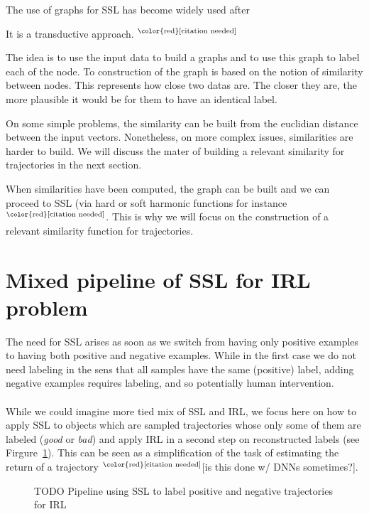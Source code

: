 \documentclass{article}
\newcommand{\needcite}{${}^{\text{\color{red}[citation needed]}}$}
\begin{document}
The use of graphs for SSL has become widely used after \cite{Zhu03}

It is a transductive approach. \needcite

The idea is to use the input data to build a graphs and to use this graph to label each of the node. To construction of the graph is based on the notion of similarity between nodes. This represents how close two datas are. The closer they are, the more plausible it would be for them to have an identical label.

On some simple problems, the similarity can be built from the euclidian distance between the input vectors. Nonetheless, on more complex issues, similarities are harder to build. We will discuss the mater of building a relevant similarity for trajectories in the next section.

When similarities have been computed, the graph can be built and we can proceed to SSL (via hard or soft harmonic functions for instance \needcite. This is why we will focus on the construction of a relevant similarity function for trajectories.

\section{Mixed pipeline of SSL for IRL problem \label{sec:combine}}

The need for SSL arises as soon as we switch from having only positive examples to having both positive and negative examples. While in the first case we do not need labeling in the sens that all samples have the same (positive) label, adding negative examples requires labeling, and so potentially human intervention.

\paragraph{}
While we could imagine more tied mix of SSL and IRL, we focus here on how to apply SSL to objects which are sampled trajectories whose only some of them are labeled (\emph{good} or \emph{bad}) and apply IRL in a second step on reconstructed labels (see Firgure~\ref{fig:pipeline}). This can be seen as a simplification of the task of estimating the return of a trajectory \needcite [is this done w/ DNNs sometimes?].

\begin{figure}
\caption{TODO Pipeline using SSL to label positive and negative trajectories for IRL\label{fig:pipeline}}
\end{figure}
\end{document}
